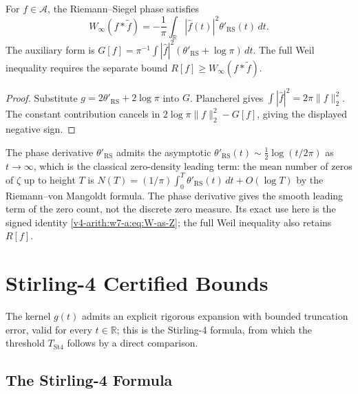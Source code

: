 \begin{corollary}
\label{v4-arith:w7-a:cor:Z-reformulation}
For \(f\in\mathscr A\), the Riemann--Siegel phase satisfies
\begin{equation}
\label{v4-arith:w7-a:eq:W-as-Z}
 W_\infty(f*\widetilde f)
 =-\frac1\pi\int_{\mathbb R}|\widehat f(t)|^2\theta'_{\mathrm{RS}}(t)\,dt.
\end{equation}
The auxiliary form is
\(G[f]=\pi^{-1}\int|\widehat f|^2(\theta'_{\mathrm{RS}}+\log\pi)\,dt\).
The full Weil inequality requires the separate bound
\(R[f]\ge W_\infty(f*\widetilde f)\).
\end{corollary}
\begin{proof}
Substitute \(g=2\theta'_{\mathrm{RS}}+2\log\pi\) into \(G\).
Plancherel gives \(\int|\widehat f|^2=2\pi\|f\|_2^2\).
The constant contribution cancels in
\(2\log\pi\|f\|_2^2-G[f]\), giving the displayed negative sign.
\end{proof}

\begin{remark}
\label{v4-arith:w7-a:rem:why-Z-matters}
The phase derivative \(\theta'_{\mathrm{RS}}\) admits the asymptotic
\(\theta'_{\mathrm{RS}}(t)\sim\tfrac{1}{2}\log(t/2\pi)\) as \(t\to\infty\),
which is the classical zero-density leading term: the mean number of
zeros of \(\zeta\) up to height \(T\) is
\(N(T)=(1/\pi)\int_{0}^{T}\theta'_{\mathrm{RS}}(t)\,dt+O(\log T)\) by
the Riemann--von Mangoldt formula. The phase derivative gives the smooth leading term of the zero
count, not the discrete zero measure. Its exact use here is the
signed identity \eqref{v4-arith:w7-a:eq:W-as-Z}; the full Weil
inequality also retains \(R[f]\).
\end{remark}

\section{Stirling-4 Certified Bounds}
\label{v4-arith:w7-a:stirling-4}

The kernel \(g(t)\) admits an explicit rigorous expansion with bounded
truncation error, valid for every \(t\in\mathbb{R}\); this is the
Stirling-4 formula, from which the threshold \(T_{\mathrm{St4}}\) follows
by a direct comparison.

\subsection{The Stirling-4 Formula}
\label{v4-arith:w7-a:stirling-4:formula}

